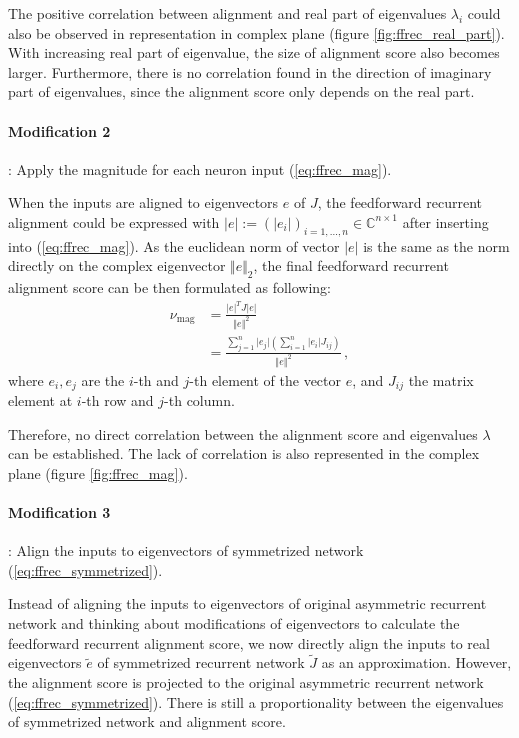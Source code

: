 \documentclass[11pt]{article}
\begin{document}
	The positive correlation between alignment and real part of eigenvalues $\lambda_i$ could also be observed in representation in complex plane (figure \ref{fig:ffrec_real_part}). With increasing real part of eigenvalue, the size of alignment score also becomes larger. Furthermore, there is no correlation found in the direction of imaginary part of eigenvalues, since the alignment score only depends on the real part. 
	
	\paragraph{Modification 2}: Apply the magnitude for each neuron input (\ref{eq:ffrec_mag}).
	
	When the inputs are aligned to eigenvectors $e$ of $J$, the feedforward recurrent alignment could be expressed with $\vert e \vert := (\vert e_{i} \vert)_{i = 1, ..., n} \in \mathbb{C}^{n \times 1}$ after inserting into (\ref{eq:ffrec_mag}). As the euclidean norm of vector $\vert e \vert$ is the same as the norm directly on the complex eigenvector $\Vert e \Vert_2$, the final feedforward recurrent alignment score can be then formulated as following:
		\begin{equation}
			\begin{split}
				\nu_{\text{mag}} & = \frac{\vert e \vert^T J \vert e \vert}{\Vert e \Vert^2} \\
				& = \frac{\sum_{j=1}^{n} \vert e_{j} \vert \left( \sum_{i = 1}^{n} \vert e_{i} \vert J_{ij} \right)}{\Vert e \Vert^2} \, ,
			\end{split}
		\end{equation}
	where $e_i, e_j$ are the $i$-th and $j$-th element of the vector $e$, and $J_{ij}$ the matrix element at $i$-th row and $j$-th column. 
	
	Therefore, no direct correlation between the alignment score and eigenvalues $\lambda$ can be established. The lack of correlation is also represented in the complex plane (figure \ref{fig:ffrec_mag}). 
	
	\paragraph{Modification 3}: Align the inputs to eigenvectors of symmetrized network (\ref{eq:ffrec_symmetrized}).
	
	Instead of aligning the inputs to eigenvectors of original asymmetric recurrent network and thinking about modifications of eigenvectors to calculate the feedforward recurrent alignment score, we now directly align the inputs to real eigenvectors $\tilde{e}$ of symmetrized recurrent network $\tilde{J}$ as an approximation. However, the alignment score is projected to the original asymmetric recurrent network (\ref{eq:ffrec_symmetrized}). There is still a proportionality between the eigenvalues of symmetrized network and alignment score. 
	
\end{document}
